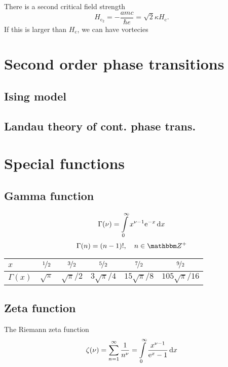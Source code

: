 \documentclass[11pt,letter, swedish, english, twocolumn
]{article}
\newcommand{\Hc}{\ensuremath{{H_{\text{c}}}}}
\newcommand{\Hcc}{\ensuremath{{H_{\text{c}_2}}}}
\begin{document}
There is a second critical field strength
\begin{equation}
\Hcc =-\frac{amc}{\hbar e} = \sqrt{2}\kappa \Hc.
\end{equation}
If this is larger than $\Hc$, we can have vortecies

\section{Second order phase transitions}

\subsection{Ising model}

\subsection{Landau theory of cont. phase trans.}


\clearpage
\appendix
\section{Special functions}
\subsection{Gamma function}
\begin{equation}
\Gamma(\nu)=\int_0^\infty x^{\nu-1}\ee^{-x}\id{x}
\end{equation}
\begin{equation}
\Gamma(n)=(n-1)!\qcomma n\in\Z^+
\end{equation}

\begin{center}
\begin{tabular}{|l||c|c|c|c|c|}\hline
$x$ & $\nicefrac{1}{2}$ & $\nicefrac{3}{2}$ & $\nicefrac{5}{2}$
& $\nicefrac{7}{2}$ & $\nicefrac{9}{2}$\\ \hline
$\Gamma(x)$ & $\sqrt{\pi}$ & $\sqrt{\pi}/2$ & $3\sqrt{\pi}/4$
& $15\sqrt{\pi}/8$ & $105\sqrt{\pi}/16$
\\ \hline
\end{tabular}
\end{center}


\subsection{Zeta function}
The Riemann zeta function
\begin{equation}
\zeta(\nu)=\sum_{n=1}^\infty \frac{1}{n^\nu}
=\int_0^\infty \frac{x^{\nu-1}}{\ee^x -1}\id{x}
\end{equation}
\end{document}
